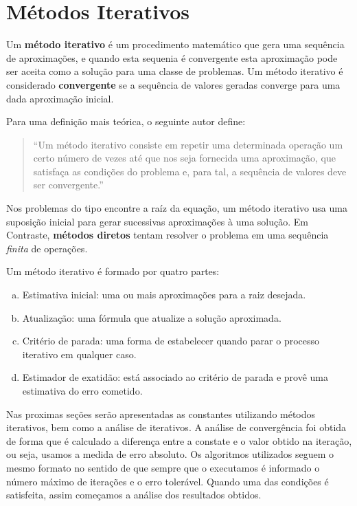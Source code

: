 \section{Métodos Iterativos}
\label{sec:metodos-iterativos}

	Um \textbf{método iterativo} é um procedimento matemático que gera uma
	sequência de aproximações, e quando esta sequenia é convergente esta
	aproximação pode ser aceita como a solução para uma classe de problemas. Um
	método iterativo é considerado \textbf{convergente} se a sequência de
	valores geradas converge para uma dada aproximação inicial.

	Para uma definição mais teórica, o seguinte autor define:

	\begin{quotation}

		``Um método iterativo consiste em repetir uma determinada operação um
		certo número de vezes até que nos seja fornecida uma aproximação, que
		satisfaça as condições do problema e, para tal, a sequência de valores
		deve ser convergente.''\cite{batista2014metodos}

	\end{quotation}

	Nos problemas do tipo encontre a raíz da equação, um método iterativo usa
	uma suposição inicial para gerar sucessivas aproximações à uma solução. Em
	Contraste, \textbf{métodos diretos} tentam resolver o problema em uma
	sequência \emph{finita} de operações.

	Um método iterativo é formado por quatro partes:~\cite{claudio2000calculo}

	\begin{enumerate}[a)]

		\item Estimativa inicial: uma ou mais aproximações para a raiz desejada.

		\item Atualização: uma fórmula que atualize a solução aproximada.

		\item Critério de parada: uma forma de estabelecer quando parar o
			processo iterativo em qualquer caso.

		\item Estimador de exatidão: está associado ao critério de parada e
			provê uma estimativa do erro cometido.

	\end{enumerate}

	Nas proximas seções serão apresentadas as constantes utilizando métodos
	iterativos, bem como a análise de iterativos. A análise de convergência foi
	obtida de forma que é calculado a diferença entre a constate e o valor
	obtido na iteração, ou seja, usamos a medida de erro absoluto. Os algoritmos
	utilizados seguem o mesmo formato no sentido de que sempre que o executamos
	é informado o número máximo de iterações e o erro tolerável. Quando uma das
	condições é satisfeita, assim começamos a análise dos resultados obtidos.

